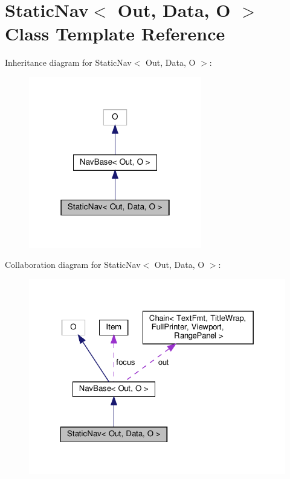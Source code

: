 \hypertarget{classStaticNav}{}\section{Static\+Nav$<$ Out, Data, O $>$ Class Template Reference}
\label{classStaticNav}


Inheritance diagram for Static\+Nav$<$ Out, Data, O $>$\+:\nopagebreak
\begin{figure}[H]
\begin{center}
\leavevmode
\includegraphics[width=214pt]{classStaticNav__inherit__graph}
\end{center}
\end{figure}


Collaboration diagram for Static\+Nav$<$ Out, Data, O $>$\+:\nopagebreak
\begin{figure}[H]
\begin{center}
\leavevmode
\includegraphics[width=323pt]{classStaticNav__coll__graph}
\end{center}
\end{figure}
